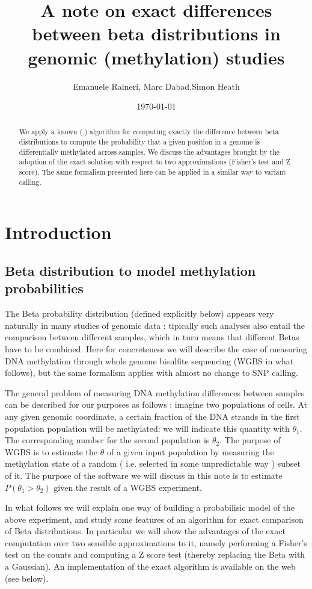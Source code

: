 \documentclass[11pt]{amsart}
\title{A note on exact differences between beta distributions in genomic (methylation) studies}
\author{Emanuele Raineri, Marc Dabad,Simon Heath}
\date{\today}
\begin{document}
\begin{abstract}
We apply a known (\cite{exactbetaineq},\cite{numineq}) algorithm for computing exactly the difference between beta distributions
to compute the probability that a given position in a genome is differentially methylated across
samples. We discuss the advantages brought by the adoption of the exact solution
with respect to two approximations (Fisher's test and Z score).
The same formalism presented here can be applied in a similar way to variant calling.
\end{abstract}
\maketitle
\section{Introduction}
\subsection{Beta distribution to model methylation probabilities}
The Beta probability distribution (defined explicitly below)  appears very naturally in many studies of genomic data : tipically such analyses also entail the comparison between different samples, which in turn means that different Betas have to be combined. Here for concreteness we will describe the case of measuring DNA methylation through whole genome bisulfite sequencing (WGBS in what follows), but the same formalism  applies with almost no change to SNP calling. 

The general problem  of measuring DNA methylation differences between samples can be described for our purposes as follows : imagine two populations of cells. At any given genomic coordinate, a certain fraction of the DNA strands in the first population population will be methylated: we will indicate this quantity with $\theta_1$. The corresponding number for the second population is $\theta_2$. The purpose of WGBS is to estimate the $\theta$ of a given input population by measuring the methylation state of a random ( i.e. selected in some unpredictable way )  subset of it. The purpose of the software we will discuss in this note is to estimate $P(\theta_1>\theta_2)$ given the result of a WGBS experiment.

In what follows we will explain one way of building a probabilisic model of the above experiment, and study some features of an algorithm for exact comparison of Beta distributions. In particular we will show the advantages of the exact computation over two sensible approximations to it, namely performing a Fisher's test on the counts and computing a Z score test (thereby replacing the Beta with a Gaussian). An implementation of the exact algorithm is available on the web (see below).
\end{document}
